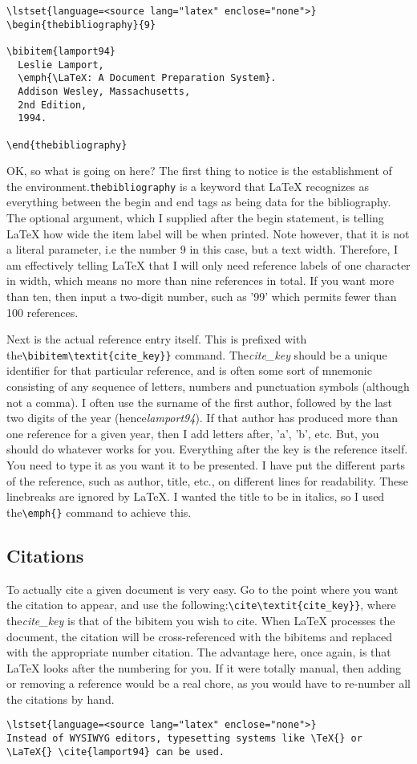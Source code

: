 \begin{lstlisting}
\lstset{language=<source lang="latex" enclose="none">}
\begin{thebibliography}{9}

\bibitem{lamport94}
  Leslie Lamport,
  \emph{\LaTeX: A Document Preparation System}.
  Addison Wesley, Massachusetts,
  2nd Edition,
  1994.

\end{thebibliography}
\end{lstlisting}
OK, so what is going on here? The first thing to notice is the establishment of
the environment.\verb|thebibliography| is a keyword that LaTeX recognizes as
everything between the begin and end tags as being data for the bibliography.
The optional argument, which I supplied after the begin statement, is telling
LaTeX how wide the item label will be when printed. Note however, that it is
not a literal parameter, i.e the number 9 in this case, but a text width.
Therefore, I am effectively telling LaTeX that I will only need reference
labels of one character in width, which means no more than nine references in
total. If you want more than ten, then input a two-digit number, such as '99'
which permits fewer than 100 references.

Next is the actual reference entry itself. This is prefixed with
the\verb|\bibitem\textit{cite_key}}| command. The\textit{cite\_key} should be a
unique identifier for that particular reference, and is often some sort of
mnemonic consisting of any sequence of letters, numbers and punctuation symbols
(although not a comma). I often use the surname of the first author, followed
by the last two digits of the year (hence\textit{lamport94}). If that author
has produced more than one reference for a given year, then I add letters
after, 'a', 'b', etc. But, you should do whatever works for you. Everything
after the key is the reference itself. You need to type it as you want it to be
presented. I have put the different parts of the reference, such as author,
title, etc., on different lines for readability. These linebreaks are ignored
by LaTeX. I wanted the title to be in italics, so I used the\verb|\emph{}|
command to achieve this.

\subsection{Citations}
To actually cite a given document is very easy. Go to the point where you want
the citation to appear, and use the following:\verb|\cite\textit{cite_key}}|,
where the\textit{cite\_key} is that of the bibitem you wish to cite. When LaTeX
processes the document, the citation will be cross-referenced with the bibitems
and replaced with the appropriate number citation. The advantage here, once
again, is that LaTeX looks after the numbering for you. If it were totally
manual, then adding or removing a reference would be a real chore, as you would
have to re-number all the citations by hand.
\begin{lstlisting}
\lstset{language=<source lang="latex" enclose="none">}
Instead of WYSIWYG editors, typesetting systems like \TeX{} or \LaTeX{} \cite{lamport94} can be used.
\end{lstlisting}


